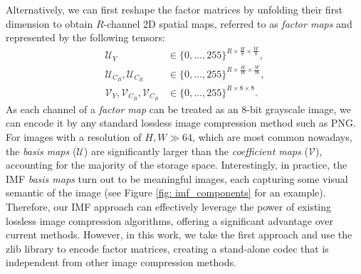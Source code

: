 Alternatively, we can first reshape the factor matrices by unfolding their first dimension to obtain $R$-channel 2D spatial maps, referred to as \emph{factor maps} and represented by the following tensors:
\begin{align} \label{eq: reshaped factors}
	\bm{\mathcal{U}}_{Y} & \in \{0, \ldots, 255\}^{R \times \frac{H}{8} \times \frac{W}{8}}, \nonumber \\
	\bm{\mathcal{U}}_{C_B}, \bm{\mathcal{U}}_{C_R} & \in \{0, \ldots, 255\}^{R \times \frac{H}{16} \times \frac{W}{16}}, \\
	\bm{\mathcal{V}}_{Y}, \bm{\mathcal{V}}_{C_B}, \bm{\mathcal{V}}_{C_R} & \in \{0, \ldots, 255\}^{R \times 8 \times 8}. \nonumber
\end{align}
As each channel of a \emph{factor map} can be treated as an 8-bit grayscale image, we can encode it by any standard lossless image compression method such as PNG. For images with a resolution of $H, W \gg 64$, which are most common nowadays, the \emph{basis maps} ($\bm{\mathcal{U}}$) are significantly larger than the \emph{coefficient maps} ($\bm{\mathcal{V}}$), accounting for the majority of the storage space. Interestingly, in practice, the IMF \emph{basis maps} turn out to be meaningful images, each capturing some visual semantic of the image (see Figure \ref{fig: imf_components} for an example). Therefore, our IMF approach can effectively leverage the power of existing lossless image compression algorithms, offering a significant advantage over current methods. However, in this work, we take the first approach and use the zlib library \cite{deutsch1996zlib} to encode factor matrices, creating a stand-alone codec that is independent from other image compression methods.

